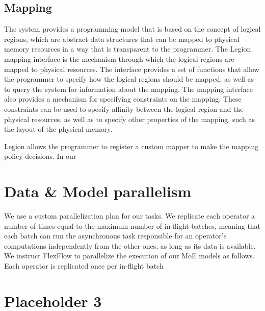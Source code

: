 \subsection{Mapping}
The system provides a programming model that is based on the concept of logical regions, which are abstract data structures that can be mapped to physical memory resources in a way that is transparent to the programmer. The Legion mapping interface is the mechanism through which the logical regions are mapped to physical resources. The interface provides a set of functions that allow the programmer to specify how the logical regions should be mapped, as well as to query the system for information about the mapping. The mapping interface also provides a mechanism for specifying constraints on the mapping. These constraints can be used to specify affinity between the logical region and the physical resources, as well as to specify other properties of the mapping, such as the layout of the physical memory.

Legion allows the programmer to register a custom mapper to make the mapping policy decisions. In our 

\section{Data \& Model parallelism}
We use a custom parallelization plan for our tasks. We replicate each operator a number of times equal to the maximum number of in-flight batches, meaning that each batch can run the asynchronous task responsible for an operator's computations independently from the other ones, as long as its data is available. 
We instruct FlexFlow to parallelize the execution of our MoE models as follows. Each operator is replicated once per in-flight batch 



\section{Placeholder 3}

